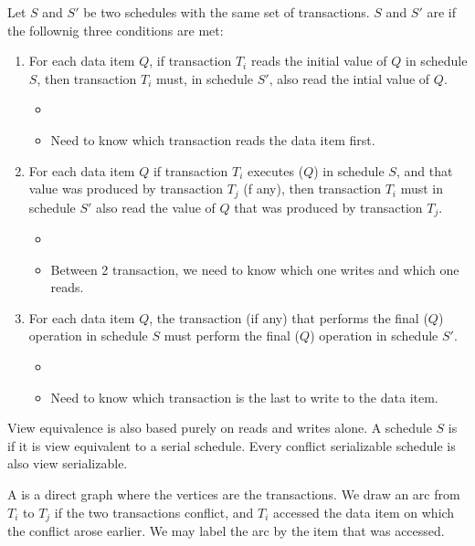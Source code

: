 \documentclass{article}
\begin{document}
Let $S$ and $S'$ be two schedules with the same set of transactions. $S$ and $S'$ are  if the follownig three conditions are met: 
\begin{enumerate}
  \item For each data item $Q$, if transaction $T_i$ reads the initial value of $Q$ in schedule $S$, then transaction $T_i$ must, in schedule $S'$, also read the intial value of $Q$. 
    \begin{itemize}
      \item {}
      \item Need to know which transaction reads the data item first. 
    \end{itemize}
  \item For each data item $Q$ if transaction $T_i$ executes ($Q$) in schedule $S$, and that value was produced by transaction $T_j$ (f any), then transaction $T_i$ must in schedule $S'$ also read the value of $Q$ that was produced by transaction $T_j$. 
    \begin{itemize}
      \item {}
      \item Between 2 transaction, we need to know which one writes and which one reads. 
    \end{itemize}
  \item For each data item $Q$, the transaction (if any) that performs the final ($Q$) operation in schedule $S$ must perform the final ($Q$) operation in schedule $S'$. 
    \begin{itemize}
      \item {}
      \item Need to know which transaction is the last to write to the data item.
    \end{itemize}
\end{enumerate}

View  equivalence is also based purely on reads and writes alone. A schedule $S$ is  if it is view equivalent to a serial schedule. Every conflict serializable schedule is also view serializable. 

A  is a direct graph where the vertices are the transactions. We draw an arc from $T_i$ to $T_j$ if the two transactions conflict, and $T_i$ accessed the data item on which the conflict arose earlier. We may label the arc by the item that was accessed. \\ 
\end{document}
